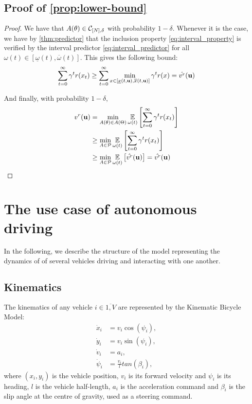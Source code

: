 \documentclass{article}
\begin{document}
\subsection{Proof of \autoref{prop:lower-bound}}

\begin{proof}
We have that $A(\theta) \in \mathcal{C}_{[N],\delta}$ with probability $1-\delta$. Whenever it is the case, we have by \autoref{thm:predictor} that the inclusion property \eqref{eq:interval_property} is verified by the interval predictor \eqref{eq:interval_predictor} for all $\omega(t)\in[\underline{\omega}(t), \overline{\omega}(t)]$. This gives the following bound:
\begin{equation*}
 \sum_{t=0}^\infty \gamma^t r(x_t) \geq \sum_{t=0}^\infty \min_{x\in[\underline{x}(t, \mathbf{u}), \overline{x}(t, \mathbf{u})]} \gamma^t r(x) = \hat{v^r}(\mathbf{u})
\end{equation*}

And finally, with probability $1-\delta$,
\begin{align*}
v^r(\mathbf{u}) &= \min_{A(\theta) \in A(\Theta)} \operatorname*{\mathbb{E}}\limits_{\omega(t)}\left[\sum_{t=0}^\infty \gamma^t r(x_t)\right] \\
&\geq \min_{A \in \mathcal{P}} \operatorname*{\mathbb{E}}\limits_{\omega(t)}\left[\sum_{t=0}^\infty \gamma^t r(x_t)\right] \\
& \geq \min_{A \in \mathcal{P}} \operatorname*{\mathbb{E}}\limits_{\omega(t)}\left[\hat{v^r}(\mathbf{u})\right] = \hat{v^r}(\mathbf{u})
\end{align*}
\end{proof}

\section{The use case of autonomous driving}

In the following, we describe the structure of the model representing the dynamics of of several vehicles driving and interacting with one another.

\subsection{Kinematics}

The kinematics of any vehicle $i\in\overline{1,V}$ are represented by the Kinematic Bicycle Model:
\begin{align}
	\dot{x}_i &= v_i\cos(\psi_i), \nonumber\\
	\dot{y}_i &= v_i\sin(\psi_i), \nonumber\\
	\dot{v}_i &= a_i, \nonumber\\
	\dot{\psi}_i &= \frac{v_i}{l}tan(\beta_i), \nonumber
\end{align}
where $(x_i, y_i)$ is the vehicle position, $v_i$ is its forward velocity and $\psi_i$ is its heading, $l$ is the vehicle half-length, $a_i$ is the acceleration command and $\beta_i$ is the slip angle at the centre of gravity, used as a steering command.
\end{document}
